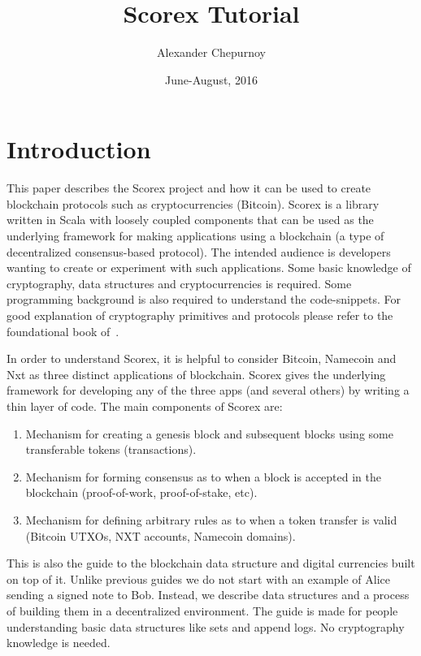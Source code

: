 \documentclass[]{report}   %
\begin{document}
\lstset{language=Scala}

\title{Scorex Tutorial}
\author{Alexander Chepurnoy}         
\date{June-August, 2016}
\maketitle


\chapter{Introduction}

This paper describes the Scorex project and how it can be used to create blockchain protocols such as cryptocurrencies (Bitcoin). Scorex is a library written in Scala with loosely coupled components that can be used as the underlying framework for making applications using a blockchain (a type of decentralized consensus-based protocol). 
The intended audience is developers wanting to create or experiment with such applications. Some basic knowledge of cryptography, data structures and cryptocurrencies is required. Some programming background is also required to understand the code-snippets. For good explanation of cryptography primitives and protocols please refer to the foundational book of~\cite{katz2014introduction}. 

In order to understand Scorex, it is helpful to consider Bitcoin, Namecoin and Nxt as three distinct applications of blockchain. Scorex gives the underlying framework for developing any of the three apps (and several others) by writing a thin layer of code. The main components of Scorex are:
\begin{enumerate}
	\item Mechanism for creating a genesis block and subsequent blocks using some transferable tokens (transactions).
	\item Mechanism for forming consensus as to when a block is accepted in the blockchain (proof-of-work, proof-of-stake, etc).
	\item Mechanism for defining arbitrary rules as to when a token transfer is valid (Bitcoin UTXOs, NXT accounts, Namecoin domains).
\end{enumerate}

This is also the guide to the blockchain data structure and digital currencies built on top of it. Unlike previous guides we do not start with an example of Alice sending a signed note to Bob. Instead, we describe data structures and a process of building them in a decentralized environment. The guide is made for people understanding basic data structures like sets and append logs. No cryptography knowledge is needed.
\end{document}
